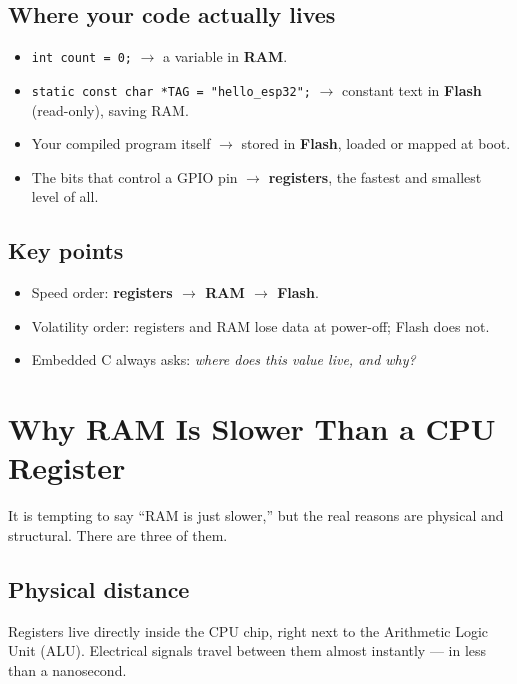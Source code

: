 \documentclass[11pt]{article}
\begin{document}
\subsection{Where your code actually lives}

\begin{itemize}
    \item \texttt{int count = 0;} $\rightarrow$ a variable in \textbf{RAM}.
    \item \texttt{static const char *TAG = "hello\_esp32";} $\rightarrow$ constant text in \textbf{Flash} (read-only), saving RAM.
    \item Your compiled program itself $\rightarrow$ stored in \textbf{Flash}, loaded or mapped at boot.
    \item The bits that control a GPIO pin $\rightarrow$ \textbf{registers}, the fastest and smallest level of all.
\end{itemize}

\subsection{Key points}

\begin{itemize}
    \item Speed order: \textbf{registers $\rightarrow$ RAM $\rightarrow$ Flash}.
    \item Volatility order: registers and RAM lose data at power-off; Flash does not.
    \item Embedded C always asks: \emph{where does this value live, and why?}
\end{itemize}

\newpage

\section{Why RAM Is Slower Than a CPU Register}

It is tempting to say ``RAM is just slower,'' but the real reasons are physical and structural. There are three of them.

\subsection{Physical distance}

Registers live directly inside the CPU chip, right next to the Arithmetic Logic Unit (ALU). Electrical signals travel between them almost instantly --- in less than a nanosecond.
\end{document}
